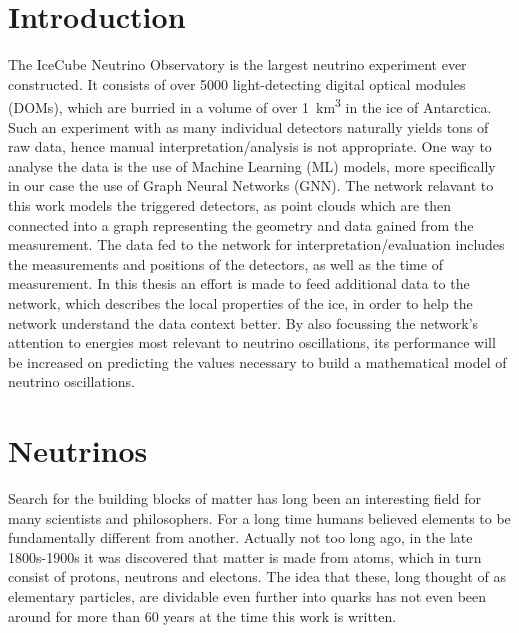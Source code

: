 \documentclass[a4paper,10pt]{scrartcl}
\begin{document}
\thispagestyle{empty}
\newpage

\tableofcontents

\newpage



\section{Introduction}

The IceCube Neutrino Observatory is the largest neutrino experiment ever constructed.
It consists of over 5000 light-detecting digital optical modules (DOMs), which are burried in a volume of over \SI{1}{km^3} in the ice of Antarctica.
Such an experiment with as many individual detectors naturally yields tons of raw data, hence manual interpretation/analysis is not appropriate.
One way to analyse the data is the use of Machine Learning (ML) models, more specifically in our case the use of Graph Neural Networks (GNN).
The network relavant to this work models the triggered detectors, as point clouds which are then connected into a graph representing the geometry and data gained from the measurement.
The data fed to the network for interpretation/evaluation includes the measurements and positions of the detectors, as well as the time of measurement.
In this thesis an effort is made to feed additional data to the network, which describes the local properties of the ice, in order to help the network understand the data context better.
By also focussing the network's attention to energies most relevant to neutrino oscillations, its performance will be increased on predicting the values necessary to build a mathematical model of neutrino oscillations.

\section{Neutrinos}

Search for the building blocks of matter has long been an interesting field for many scientists and philosophers.
For a long time humans believed elements to be fundamentally different from another.
Actually not too long ago, in the late 1800s-1900s it was discovered that matter is made from atoms, which in turn consist of protons, neutrons and electons.
The idea that these, long thought of as elementary particles, are dividable even further into quarks has not even been around for more than 60 years at the time this work is written.
\end{document}
